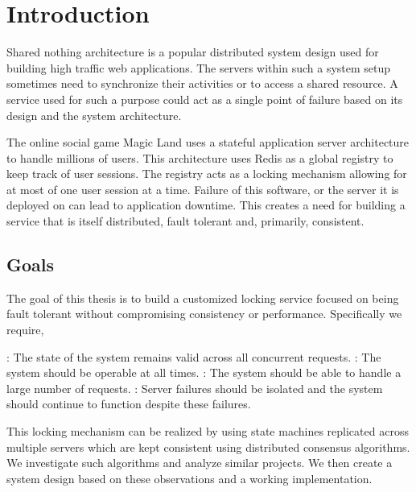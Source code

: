 \chapter{Introduction}
\label{chapter:introduction}

Shared nothing architecture%
 \citep{Stonebraker86g} is a popular distributed system design used for
building high traffic web applications. The servers within such a system setup
sometimes need to synchronize their activities or to access a shared
resource. A service used for such a purpose could act as a single point of
failure based on its design and the system architecture.

The online social game Magic Land uses a stateful application server
architecture to handle millions of users. This architecture uses Redis as
a global registry to keep track of user sessions. The registry acts as a
locking mechanism allowing for at most of one user session at a time. Failure
of this software, or the server it is deployed on can
lead to application downtime. This creates a need for
building a service that is itself
distributed, fault tolerant and, primarily, consistent.

\section{Goals}

The goal of this thesis is to build a customized locking service focused on
being fault tolerant without compromising consistency or performance.
Specifically we require,

\begin{itemize}
    : The state of the system remains valid across
    all concurrent requests.
    : The system should be operable at all times.
    : The system should be able to handle a large number of
    requests.
    : Server failures should be isolated and the system
    should continue to function despite these failures.
\end{itemize}

This locking mechanism can be realized by using state machines replicated
across multiple servers which are kept consistent using distributed consensus
algorithms. We investigate such algorithms and analyze similar
projects. We then create a system design based on these observations and
a working implementation.

